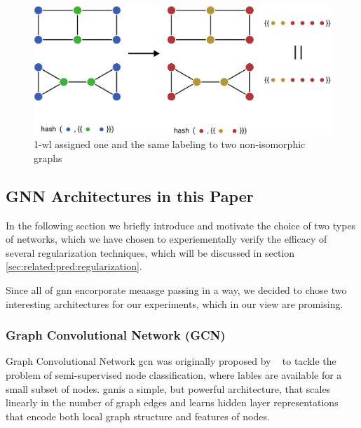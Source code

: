 \begin{figure}[ht]
    \centering
    \includegraphics[width= 0.90\linewidth]{gfx/related-work/1wl-indistinguishable}
    \caption{1-\ac{wl} assigned one and the same labeling to two non-isomorphic graphs~\cite{Liu2022}}\label{fig:related:1-wl-indistinguishable}
\end{figure}


\subsection{GNN Architectures in this Paper}
\label{sec:related:architectures}


In the following section we briefly introduce and
motivate the choice of two types of networks, which we have
chosen to experiementally verify the efficacy of several regularization techniques, which will be
discussed in section \cref{sec:related:pred:regularization}.

Since all of \ac{gnn} encorporate meaasge passing in a way, we decided to chose two interesting
architectures for our experiments, which in our view are promising.
\subsubsection{Graph Convolutional Network (GCN)}
\label{sec:related:architectures:gcn}
Graph Convolutional Network \ac{gcn} was originally proposed by \citeauthor{Kipf2017}~\cite{Kipf2017} to tackle
the problem of semi-supervised node classification, where lables are available for a small subset of
nodes. \ac{gnn}is a simple, but powerful architecture, that scales linearly in the number of graph
edges and learns hidden layer representations that encode both local graph structure and features of nodes.

